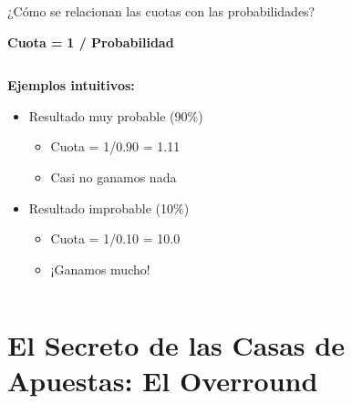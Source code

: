 \documentclass[aspectratio=169]{beamer}
\begin{document}
\begin{frame}{¿Cómo se relacionan las cuotas con las probabilidades?}
\begin{center}
\Large
\textcolor{azulprincipai}{\textbf{Cuota = }} \textcolor{rojocomplementario}{\textbf{1 / Probabilidad}}
\end{center}

\vspace{0.5cm}

\begin{columns}
\begin{column}{0.5\textwidth}
\textbf{Ejemplos intuitivos:}
\begin{itemize}
\item Resultado muy probable (90\%)
  \begin{itemize}
  \item Cuota = 1/0.90 = 1.11
  \item Casi no ganamos nada
  \end{itemize}
\item Resultado improbable (10\%)
  \begin{itemize}
  \item Cuota = 1/0.10 = 10.0
  \item ¡Ganamos mucho!
  \end{itemize}
\end{itemize}
\end{column}
\begin{column}{0.5\textwidth}
\end{column}
\end{columns}
\end{frame}

\section{El Secreto de las Casas de Apuestas: El Overround}
\end{document}
